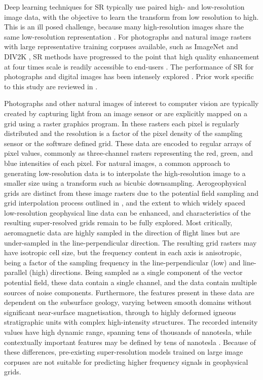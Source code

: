 Deep learning techniques for SR typically use paired high- and low-resolution image data, with the objective to learn the transform from low resolution to high.
This is an ill posed challenge, because many high-resolution images share the same low-resolution representation \parencite{dongImageSuperresolutionUsing2016}.
For photographs and natural image rasters with large representative training corpuses available, such as ImageNet \parencite{dengImageNetLargescaleHierarchical2009} and DIV2K \parencite{agustssonNTIRE2017Challenge2017}, SR methods have progressed to the point that high quality enhancement at four times scale is readily accessible to end-users \parencite[e.g.][]{wangRealESRGANTrainingRealWorld2021}.
The performance of SR for photographs and digital images has been intensely explored \parencite[see a review in][]{moserHitchhikerGuideSuperResolution2023}.
Prior work specific to this study are reviewed in .

Photographs and other natural images of interest to computer vision are typically created by capturing light from an image sensor or are explicitly mapped on a grid using a raster graphics program.
In these rasters each pixel is regularly distributed and the resolution is a factor of the pixel density of the sampling sensor or the software defined grid.
These data are encoded to regular arrays of pixel values, commonly as three-channel rasters representing the red, green, and blue intensities of each pixel.
For natural images, a common approach to generating low-resolution data is to interpolate the high-resolution image to a smaller size using a transform such as bicubic downsampling.
Aerogeophysical grids are distinct from these image rasters due to the potential field sampling and grid interpolation process outlined in , and the extent to which widely spaced low-resolution geophysical line data can be enhanced, and characteristics of the resulting super-resolved grids remain to be fully explored.
Most critically, aeromagnetic data are highly sampled in the direction of flight lines but are under-sampled in the line-perpendicular direction.
The resulting grid rasters may have isotropic cell size, but the frequency content in each axis is anisotropic, being a factor of the sampling frequency in the line-perpendicular (low) and line-parallel (high) directions.
Being sampled as a single component of the vector potential field, these data contain a single channel, and the data contain multiple sources of noise components.
Furthermore, the features present in these data are dependent on the subsurface geology, varying between smooth domains without significant near-surface magnetisation, through to highly deformed igneous stratigraphic units with complex high-intensity structures.
The recorded intensity values have high dynamic range, spanning tens of thousands of nanotesla, while contextually important features may be defined by tens of nanotesla \parencite{kovesiPhasePreservingTone2012}.
Because of these differences, pre-existing super-resolution models trained on large image corpuses are not suitable for predicting higher frequency signals in geophysical grids.

